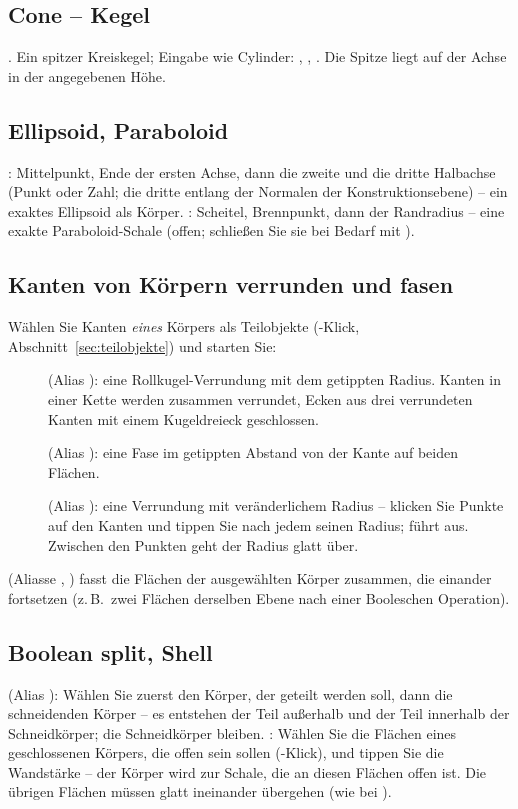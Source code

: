 \subsection{Cone -- Kegel}\label{sec:cmd-cone}
. Ein spitzer Kreiskegel; Eingabe wie Cylinder:
, ,
. Die Spitze liegt auf der Achse in der angegebenen Höhe.

\subsection{Ellipsoid, Paraboloid}\label{sec:cmd-ellipsoid}
: Mittelpunkt, Ende der ersten Achse, dann die zweite und die dritte Halbachse
(Punkt oder Zahl; die dritte entlang der Normalen der Konstruktionsebene) -- ein exaktes
Ellipsoid als Körper. : Scheitel, Brennpunkt, dann der Randradius -- eine exakte
Paraboloid-Schale (offen; schließen Sie sie bei Bedarf mit ).

\subsection{Kanten von Körpern verrunden und fasen}\label{sec:cmd-edge-blends}
Wählen Sie Kanten \emph{eines} Körpers als Teilobjekte (-Klick,
Abschnitt~\ref{sec:teilobjekte}) und starten Sie:
\begin{description}
\item[] (Alias ): eine Rollkugel-Verrundung mit dem getippten
  Radius. Kanten in einer Kette werden zusammen verrundet, Ecken aus drei verrundeten Kanten mit
  einem Kugeldreieck geschlossen.
\item[] (Alias ): eine Fase im getippten Abstand von der Kante auf
  beiden Flächen.
\item[] (Alias ): eine Verrundung mit veränderlichem
  Radius -- klicken Sie Punkte auf den Kanten und tippen Sie nach jedem seinen Radius;
   führt aus. Zwischen den Punkten geht der Radius glatt über.
\end{description}
 (Aliasse , ) fasst die Flächen der ausgewählten
Körper zusammen, die einander fortsetzen (z.\,B.\ zwei Flächen derselben Ebene nach einer
Booleschen Operation).

\subsection{Boolean split, Shell}\label{sec:cmd-boolean-split}
 (Alias ): Wählen Sie zuerst den Körper, der geteilt werden soll, dann
die schneidenden Körper -- es entstehen der Teil außerhalb und der Teil innerhalb der Schneidkörper;
die Schneidkörper bleiben. : Wählen Sie die Flächen eines geschlossenen Körpers, die
offen sein sollen (-Klick), und tippen Sie die Wandstärke -- der Körper wird zur
Schale, die an diesen Flächen offen ist. Die übrigen Flächen müssen glatt ineinander übergehen
(wie bei ).

